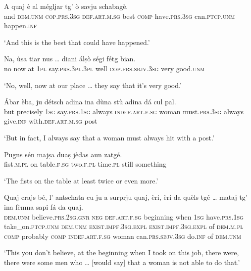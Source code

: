 \begin{linenumbers}
\gll A quaj è al mégljar tg’ ò savju schabagè.   \\
and \textsc{dem.unm} \textsc{cop.prs.3sg} \textsc{def.art.m.sg} best \textsc{comp} have.\textsc{prs.3sg} can.\textsc{ptcp.unm} happen.\textsc{inf} \\
\end{linenumbers}
\medskip
\glt `And this is the best that could have happened.'
\medskip

\begin{linenumbers}
\gll   Na, ùsa tiar nus … diani álṣò ségi fétg bian. \\
no now at \textsc{1pl} {} say.\textsc{prs.3pl.3pl} well \textsc{cop.prs.sbjv.3sg} very good.\textsc{unm} \\
\end{linenumbers}
\medskip
\glt `No, well, now at our place … they say that it’s very good.'
\medskip

\begin{linenumbers}
\gll Ábar èba, ju détsch adina ina dùna stù adina dá cul pal.\\
but precisely \textsc{1sg} say.\textsc{prs.1sg} always \textsc{indef.art.f.sg} woman must.\textsc{prs.3sg} always give.\textsc{inf} with.\textsc{def.art.m.sg} post\\
\end{linenumbers}
\medskip
\glt `But in fact, I always say that a woman must always hit with a post.'
\medskip

\begin{linenumbers}
\gll Pugns sén majṣa duaṣ jèdas aun zatgé.   \\
 fist.\textsc{m.pl} on table.\textsc{f.sg} two.\textsc{f.pl} time.\textsc{pl} still something\\
\end{linenumbers}
\medskip
\glt `The fists on the table at least twice or even more.'
\medskip

\begin{linenumbers}
\gll  Quaj crajs bé, l’ antschata cu ju a surprju quaj, èri, èri da quèls tgé … mataj\footnotemark{} tg’ ina fèmna sapi fá da quaj.\\
 \textsc{dem.unm} believe.\textsc{prs.2sg.gnr} \textsc{neg} \textsc{def.art.f.sg} beginning when \textsc{1sg} have.\textsc{prs.1sg} take\_on.\textsc{ptcp.unm} \textsc{dem.unm} \textsc{exist.impf.3sg.expl} \textsc{exist.impf.3sg.expl} of \textsc{dem.m.pl} \textsc{comp} {} probably \textsc{comp} \textsc{indef.art.f.sg} woman can.\textsc{prs.sbjv.3sg} do.\textsc{inf} of \textsc{dem.unm}\\
\end{linenumbers}
\medskip
\glt `This you don’t believe, at the beginning when I took on this job, there were, there were some men who … [would say] that a woman is not able to do that.'
\medskip

